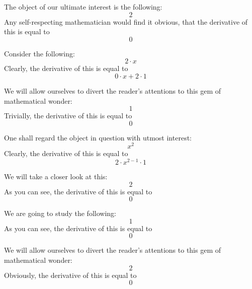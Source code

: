 \documentclass{article}
\begin{document}
The object of our ultimate interest is the following:
\begin{equation}
2 
\end{equation}
Any self-respecting mathematician would find it obvious, that the derivative of this is equal to
\begin{equation}
0 
\end{equation}

Consider the following:
\begin{equation}
2 \cdot x 
\end{equation}
Clearly, the derivative of this is equal to
\begin{equation}
0 \cdot x + 2 \cdot 1 
\end{equation}

We will allow ourselves to divert the reader's attentions to this gem of mathematical wonder:
\begin{equation}
1 
\end{equation}
Trivially, the derivative of this is equal to
\begin{equation}
0 
\end{equation}

One shall regard the object in question with utmost interest:
\begin{equation}
x ^{2 } 
\end{equation}
Clearly, the derivative of this is equal to
\begin{equation}
2 \cdot x ^{2 - 1 } \cdot 1 
\end{equation}

We will take a closer look at this:
\begin{equation}
2 
\end{equation}
As you can see, the derivative of this is equal to
\begin{equation}
0 
\end{equation}

We are going to study the following:
\begin{equation}
1 
\end{equation}
As you can see, the derivative of this is equal to
\begin{equation}
0 
\end{equation}

We will allow ourselves to divert the reader's attentions to this gem of mathematical wonder:
\begin{equation}
2 
\end{equation}
Obviously, the derivative of this is equal to
\begin{equation}
0 
\end{equation}
\end{document}
